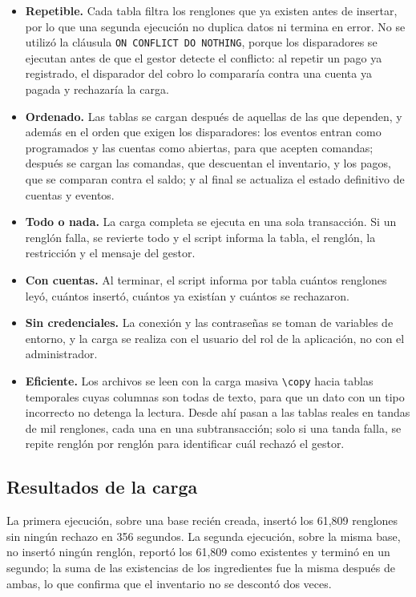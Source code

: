 \begin{itemize}
    \item \textbf{Repetible.} Cada tabla filtra los renglones que ya existen antes de insertar, por lo que una segunda ejecución no duplica datos ni termina en error. No se utilizó la cláusula \texttt{ON CONFLICT DO NOTHING}, porque los disparadores se ejecutan antes de que el gestor detecte el conflicto: al repetir un pago ya registrado, el disparador del cobro lo compararía contra una cuenta ya pagada y rechazaría la carga.
    \item \textbf{Ordenado.} Las tablas se cargan después de aquellas de las que dependen, y además en el orden que exigen los disparadores: los eventos entran como programados y las cuentas como abiertas, para que acepten comandas; después se cargan las comandas, que descuentan el inventario, y los pagos, que se comparan contra el saldo; y al final se actualiza el estado definitivo de cuentas y eventos.
    \item \textbf{Todo o nada.} La carga completa se ejecuta en una sola transacción. Si un renglón falla, se revierte todo y el script informa la tabla, el renglón, la restricción y el mensaje del gestor.
    \item \textbf{Con cuentas.} Al terminar, el script informa por tabla cuántos renglones leyó, cuántos insertó, cuántos ya existían y cuántos se rechazaron.
    \item \textbf{Sin credenciales.} La conexión y las contraseñas se toman de variables de entorno, y la carga se realiza con el usuario del rol de la aplicación, no con el administrador.
    \item \textbf{Eficiente.} Los archivos se leen con la carga masiva \texttt{\textbackslash copy} \parencite{postgres_copy} hacia tablas temporales cuyas columnas son todas de texto, para que un dato con un tipo incorrecto no detenga la lectura. Desde ahí pasan a las tablas reales en tandas de mil renglones, cada una en una subtransacción; solo si una tanda falla, se repite renglón por renglón para identificar cuál rechazó el gestor.
\end{itemize}

\subsection{Resultados de la carga}

La primera ejecución, sobre una base recién creada, insertó los 61,809 renglones sin ningún rechazo en 356 segundos. La segunda ejecución, sobre la misma base, no insertó ningún renglón, reportó los 61,809 como existentes y terminó en un segundo; la suma de las existencias de los ingredientes fue la misma después de ambas, lo que confirma que el inventario no se descontó dos veces.

